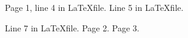 \documentclass{article}
\begin{document}
    Page 1, line 4 in \LaTeX file.
    Line 5 in \LaTeX file.

    Line 7 in \LaTeX file.
    \newpage
    Page 2.
    \newpage
    Page 3.
\end{document}
